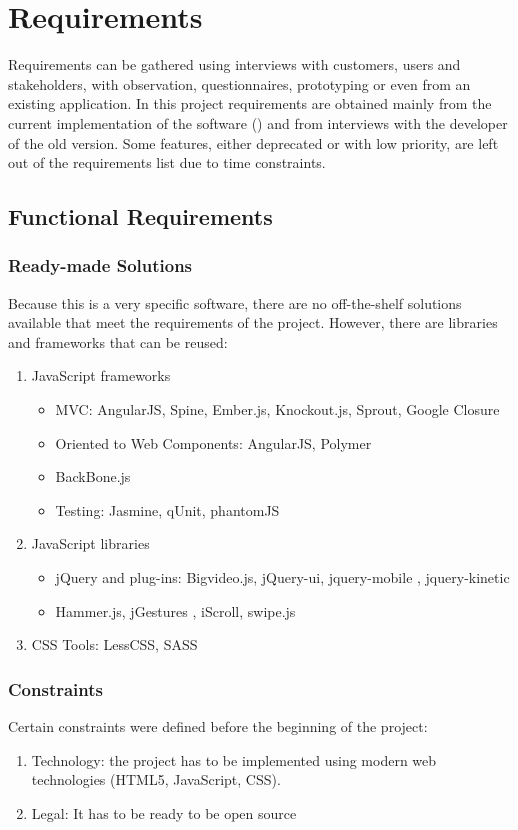 \chapter{Requirements}
Requirements can be gathered using interviews with customers, users and stakeholders, with observation, questionnaires, prototyping or even from an existing application.
In this project requirements are obtained mainly from the current implementation of the software () and from interviews with the developer of the old version.
Some features, either deprecated or with low priority, are left out of the requirements list due to time constraints. 

\section{Functional Requirements}

\subsection*{Ready-made Solutions}
Because this is a very specific software, there are no off-the-shelf solutions available that meet the requirements of the project.
However, there are libraries and frameworks that can be reused:

\begin{enumerate}
    \item JavaScript frameworks
    \begin{itemize}
        \item \ac{MVC}: AngularJS, Spine, Ember.js, Knockout.js, Sprout, Google Closure
        \item Oriented to Web Components: AngularJS, Polymer
        \item BackBone.js
    \item Testing: Jasmine, qUnit, phantomJS   
    \end{itemize}
    \item JavaScript libraries
    \begin{itemize}
        \item jQuery and plug-ins: Bigvideo.js, jQuery-ui, jquery-mobile , jquery-kinetic  
        \item Hammer.js, jGestures , iScroll, swipe.js
    \end{itemize} 
    \item \ac{CSS} Tools: LessCSS, SASS
\end{enumerate}

\subsection*{Constraints}
Certain constraints were defined before the beginning of the project:
\begin{enumerate}
    \item Technology: the project has to be implemented using modern web technologies (\ac{HTML5}, JavaScript, \ac{CSS}).
    \item Legal: It has to be ready to be open source
\end{enumerate}

